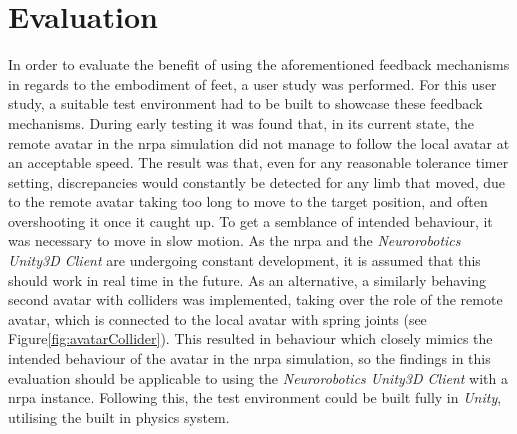 
\chapter{Evaluation}\label{chapter:Evaluation}

In order to evaluate the benefit of using the aforementioned feedback mechanisms in regards to the embodiment of feet, a user study was performed. For this user study, a suitable test environment had to be built to showcase these feedback mechanisms.
\newline
During early testing it was found that, in its current state, the remote avatar in the \gls{nrpa} simulation did not manage to follow the local avatar at an acceptable speed. The result was that, even for any reasonable tolerance timer setting, discrepancies would constantly be detected for any limb that moved, due to the remote avatar taking too long to move to the target position, and often overshooting it once it caught up. To get a semblance of intended behaviour, it was necessary to move in slow motion. 
\newline
As the \gls{nrpa} and the \textit{Neurorobotics Unity3D Client} are undergoing constant development, it is assumed that this should work in real time in the future.
\newline
As an alternative, a similarly behaving second avatar with colliders was implemented, taking over the role of the remote avatar, which is connected to the local avatar with spring joints (see Figure\autoref{fig:avatarCollider}). This resulted in behaviour which closely mimics the intended behaviour of the avatar in the \gls{nrpa} simulation, so the findings in this evaluation should be applicable to using the \textit{Neurorobotics Unity3D Client} with a 
\gls{nrpa} instance. Following this, the test environment could be built fully in \textit{Unity}, utilising the built in physics system.
